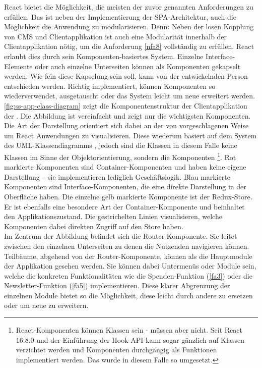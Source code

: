 React bietet die Möglichkeit, die meisten der zuvor genannten Anforderungen zu erfüllen. 
Das ist neben der Implementierung der SPA-Architektur, auch die Möglichkeit die 
Anwendung zu modularisieren. Denn: Neben der losen Kopplung von CMS und Clientapplikation
ist auch eine Modularität innerhalb der Clientapplikation nötig, um die Anforderung \ref{nfa8}
vollständig zu erfüllen. React erlaubt dies durch sein Komponenten-basiertes System. Einzelne
Interface-Elemente oder auch einzelne Unterseiten können als Komponenten gekapselt werden.
Wie fein diese Kapselung sein soll, kann von der entwickelnden Person entschieden werden. Richtig implementiert,
können Komponenten so wiederverwendet, ausgetauscht oder das System leicht um neue erweitert werden.\\
\autoref{fig:ss-app-class-diagram} zeigt die Komponentenstruktur der Clientapplikation der \shst{}.
Die Abbildung ist vereinfacht und zeigt nur die wichtigsten Komponenten. Die Art der Darstellung
orientiert sich dabei an der von  vorgeschlagenen Weise um React Anwendungen
zu visualisieren. Diese wiederum basiert auf dem System des UML-Klassendiagramms \cite{uml-spec}, 
jedoch sind die Klassen in diesem Falle keine Klassen im Sinne der Objektorientierung, sondern die Komponenten 
\footnote{React-Komponenten können Klassen sein - müssen aber nicht. Seit React 16.8.0 und
der Einführung der Hook-API \cite{react-hooks} kann sogar gänzlich auf Klassen verzichtet werden und Komponenten 
durchgängig als Funktionen implementiert werden. Das wurde in diesem Falle so umgesetzt.}.
Rot markierte Komponenten sind Container-Komponenten und haben keine eigene Darstellung -- sie implementieren
lediglich Geschäftslogik. Blau markierte Komponenten sind Interface-Komponenten, die eine direkte 
Darstellung in der Oberfläche haben. Die einzelne gelb markierte Komponente ist der Redux-Store. 
Er ist ebenfalls eine besondere Art der Container-Komponente und beinhaltet den Applikationszustand. 
Die gestrichelten Linien visualisieren, welche Komponenten dabei direkten Zugriff auf den 
Store haben.\\
Im Zentrum der Abbildung befindet sich die Router-Komponente. Sie leitet zwischen den einzelnen Unterseiten
zu denen die Nutzenden navigieren können. Teilbäume, abgehend von der Router-Komponente, können als
die Hauptmodule der Applikation gesehen werden. Sie können dabei Untermenüs oder Module sein, welche
die konkreten Funktionalitäten wie die Spenden-Funktion (\ref{fa3}) oder die Newsletter-Funktion (\ref{fa5}) 
implementieren. Diese klarer Abgrenzung der einzelnen Module bietet so die Möglichkeit, diese leicht
durch andere zu ersetzen oder um neue zu erweitern.\\

